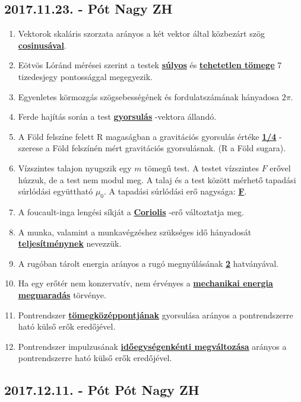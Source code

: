 \documentclass[../../fizika_kerdesek.tex]{subfiles}
\begin{document}
    \subsection{2017.11.23. - Pót Nagy ZH}

        \begin{enumerate}
            \item Vektorok skaláris szorzata arányos a két vektor által közbezárt szög \underline{\textbf{cosinusával}}.
            \item Eötvös Lóránd mérései szerint a testek \underline{\textbf{súlyos}} és \underline{\textbf{tehetetlen tömege}} 7 tizedesjegy pontossággal megegyezik.
            \item Egyenletes körmozgás szögsebességének és fordulatszámának hányadosa \textbf{\underline{$2\pi$}}.
            \item Ferde hajítás során a test \underline{\textbf{gyorsulás}} -vektora állandó.
            \item A Föld felszíne felett R magaságban a gravitációs gyorsulás értéke \underline{\textbf{1/4}} -szerese a Föld felszínén mért gravitációs gyorsulásnak. (R a Föld sugara).
            \item Vízszintes talajon nyugszik egy $m$ tömegű test. A testet vízszintes $F$ erővel húzzuk, de a test nem modul meg. A talaj és a test között mérhető tapadási súrlódási együttható $\mu_0$. A tapadási súrlódási erő nagysága: \underline{\textbf{F}}.
            \item A foucault-inga lengési síkját a \underline{\textbf{Coriolis}} -erő változtatja meg. 
            \item A munka, valamint a munkavégzéshez szükséges idő hányadosát \underline{\textbf{teljesítménynek}} nevezzük.
            \item A rugóban tárolt energia arányos a rugó megnyúlásának \underline{\textbf{2}} hatványával.
            \item Ha egy erőtér nem konzervatív, nem érvényes a \underline{\textbf{mechanikai energia megmaradás}} törvénye. 
            \item Pontrendszer \underline{\textbf{tömegközéppontjának}} gyorsulása arányos a pontrendszerre ható külső erők eredőjével.
            \item Pontrendszer impulzusának \underline{\textbf{időegységenkénti megváltozása}} arányos a pontrendszerre ható külső erők eredőjével.
        \end{enumerate}

    \subsection{2017.12.11. - Pót Pót Nagy ZH}
\end{document}
